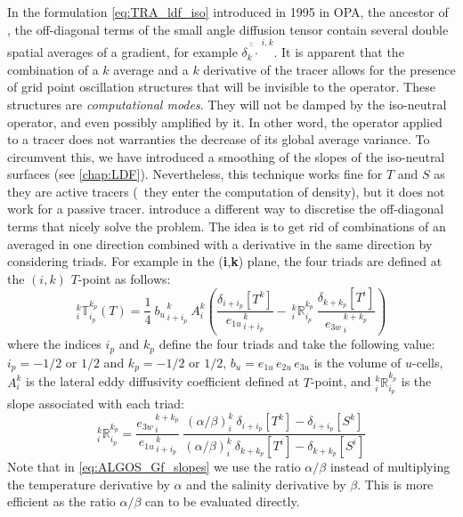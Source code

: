 \documentclass[../main/NEMO_manual]{subfiles}
\begin{document}
In the formulation \autoref{eq:TRA_ldf_iso} introduced in 1995 in OPA, the ancestor of \NEMO,
the off-diagonal terms of the small angle diffusion tensor contain several double spatial averages of a gradient,
for example $\overline{\overline{\delta_k \cdot}}^{\,i,k}$.
It is apparent that the combination of a $k$ average and a $k$ derivative of the tracer allows for
the presence of grid point oscillation structures that will be invisible to the operator.
These structures are \textit{computational modes}.
They will not be damped by the iso-neutral operator, and even possibly amplified by it.
In other word, the operator applied to a tracer does not warranties the decrease of its global average variance.
To circumvent this, we have introduced a smoothing of the slopes of the iso-neutral surfaces
(see \autoref{chap:LDF}).
Nevertheless, this technique works fine for $T$ and $S$ as they are active tracers
(\ie\ they enter the computation of density), but it does not work for a passive tracer.
\citep{griffies.gnanadesikan.ea_JPO98} introduce a different way to discretise the off-diagonal terms that
nicely solve the problem.
The idea is to get rid of combinations of an averaged in one direction combined with
a derivative in the same direction by considering triads.
For example in the (\textbf{i},\textbf{k}) plane, the four triads are defined at the $(i,k)$ $T$-point as follows:
\begin{equation}
  \label{eq:ALGOS_Gf_triads}
  _i^k \mathbb{T}_{i_p}^{k_p} (T)
  = \frac{1}{4} \ {b_u}_{\,i+i_p}^{\,k}  \  A_i^k  	\left(
    \frac{ \delta_{i + i_p}[T^k] }{ {e_{1u}}_{\,i + i_p}^{\,k} }
    -\ {_i^k \mathbb{R}_{i_p}^{k_p}} \ \frac{ \delta_{k+k_p} [T^i] }{ {e_{3w}}_{\,i}^{\,k+k_p} }
  \right)
\end{equation}
where the indices $i_p$ and $k_p$ define the four triads and take the following value:
$i_p = -1/2$ or $1/2$ and $k_p = -1/2$ or $1/2$,
$b_u= e_{1u}\,e_{2u}\,e_{3u}$ is the volume of $u$-cells,
$A_i^k$ is the lateral eddy diffusivity coefficient defined at $T$-point,
and $_i^k \mathbb{R}_{i_p}^{k_p}$ is the slope associated with each triad:
\begin{equation}
  \label{eq:ALGOS_Gf_slopes}
  _i^k \mathbb{R}_{i_p}^{k_p}
  =\frac{ {e_{3w}}_{\,i}^{\,k+k_p}} { {e_{1u}}_{\,i+i_p}^{\,k}} \ \frac
  {\left(\alpha / \beta \right)_i^k  \ \delta_{i + i_p}[T^k] - \delta_{i + i_p}[S^k] }
  {\left(\alpha / \beta \right)_i^k  \ \delta_{k+k_p}[T^i ] - \delta_{k+k_p}[S^i ] }
\end{equation}
Note that in \autoref{eq:ALGOS_Gf_slopes} we use the ratio $\alpha / \beta$ instead of
multiplying the temperature derivative by $\alpha$ and the salinity derivative by $\beta$.
This is more efficient as the ratio $\alpha / \beta$ can to be evaluated directly.
\end{document}
